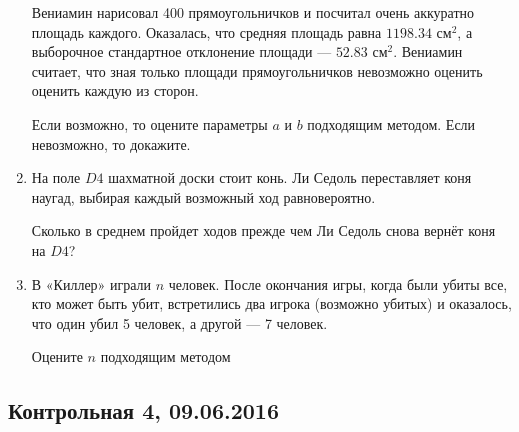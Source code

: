 \documentclass[12pt, a4paper]{article}\usepackage[]{graphicx}\usepackage[]{color}
\begin{document}
\begin{enumerate}
Вениамин нарисовал 400 прямоугольничков и посчитал очень аккуратно площадь каждого. Оказалась, что средняя площадь равна $1198.34$ см$^2$, а выборочное стандартное отклонение площади — $52.83$ см$^2$. Вениамин считает, что зная только площади прямоугольничков невозможно оценить оценить каждую из сторон.

Если возможно, то оцените параметры $a$ и $b$ подходящим методом. Если невозможно, то докажите.


\item На поле $D4$ шахматной доски стоит конь. Ли Седоль переставляет коня наугад, выбирая каждый возможный ход равновероятно.

Сколько в среднем пройдет ходов прежде чем Ли Седоль снова вернёт коня на $D4$?



\item В «Киллер» играли $n$ человек. После окончания игры, когда были убиты все, кто может быть убит, встретились два игрока (возможно убитых) и оказалось, что один убил 5 человек, а другой — 7 человек.

Оцените $n$ подходящим методом
\end{enumerate}


\subsection{Контрольная 4, 09.06.2016}
\end{document}
